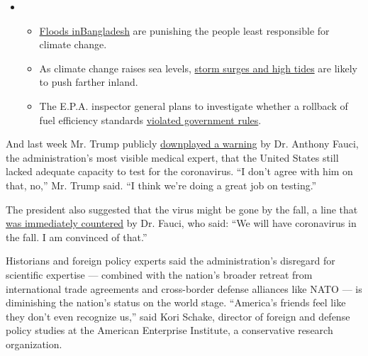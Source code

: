 \begin{itemize}
\item
  \begin{itemize}
  \tightlist
  \item
    \href{https://www.nytimes.com/2020/07/30/climate/bangladesh-floods.html?action=click\&pgtype=Article\&state=default\&region=MAIN_CONTENT_1\&context=storylines_keepup}{Floods
    in}\href{https://www.nytimes.com/2020/07/30/climate/bangladesh-floods.html?action=click\&pgtype=Article\&state=default\&region=MAIN_CONTENT_1\&context=storylines_keepup}{Bangladesh}
    are punishing the people least responsible for climate change.
  \item
    As climate change raises sea levels,
    \href{https://www.nytimes.com/2020/07/30/climate/sea-level-inland-floods.html?action=click\&pgtype=Article\&state=default\&region=MAIN_CONTENT_1\&context=storylines_keepup}{storm
    surges and high tides} are likely to push farther inland.
  \item
    The E.P.A. inspector general plans to investigate whether a rollback
    of fuel efficiency standards
    \href{https://www.nytimes.com/2020/07/27/climate/trump-fuel-efficiency-rule.html?action=click\&pgtype=Article\&state=default\&region=MAIN_CONTENT_1\&context=storylines_keepup}{violated
    government rules}.
  \end{itemize}
\end{itemize}

And last week Mr. Trump publicly
\href{https://www.cnn.com/2020/04/23/politics/fauci-testing-capacity-not-overly-confident/index.html}{downplayed
a warning} by Dr. Anthony Fauci, the administration's most visible
medical expert, that the United States still lacked adequate capacity to
test for the coronavirus. ``I don't agree with him on that, no,'' Mr.
Trump said. ``I think we're doing a great job on testing.''

The president also suggested that the virus might be gone by the fall, a
line that
\href{https://www.nytimes.com/2020/04/22/us/politics/trump-coronavirus-fall.html}{was
immediately countered} by Dr. Fauci, who said: ``We will have
coronavirus in the fall. I am convinced of that.''

Historians and foreign policy experts said the administration's
disregard for scientific expertise --- combined with the nation's
broader retreat from international trade agreements and cross-border
defense alliances like NATO --- is diminishing the nation's status on
the world stage. ``America's friends feel like they don't even recognize
us,'' said Kori Schake, director of foreign and defense policy studies
at the American Enterprise Institute, a conservative research
organization.


